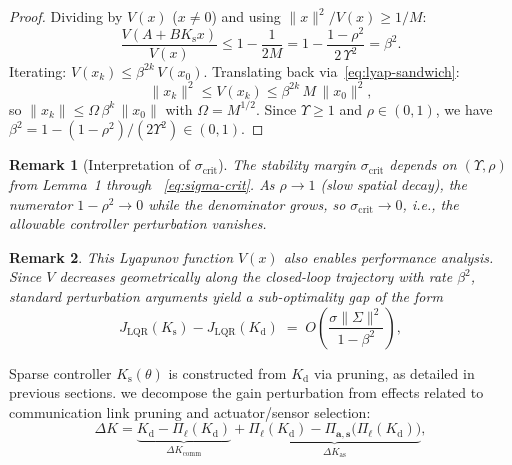 \documentclass[letterpaper, 10pt, conference]{ieeeconf}
\newtheorem{remark}{Remark}
\begin{document}
\begin{proof}
Dividing by $V(x)$ ($x \ne 0$) and using
$\|x\|^{2}/V(x) \ge 1/M$:
\[
  \frac{V(A+BK_{\mathrm{s}} x)}{V(x)}
  \le 1 - \frac{1}{2M} = 1 - \frac{1-\rho^{2}}{2\,\Upsilon^{2}}
  = \beta^{2}.
\]
Iterating: $V(x_k) \le \beta^{2k}\,V(x_0)$.
Translating back via~\eqref{eq:lyap-sandwich}:
\[
  \|x_k\|^{2}
  \le V(x_k)
  \le \beta^{2k}\,M\,\|x_0\|^{2},
\]
so $\|x_k\| \le \Omega\,\beta^{k}\,\|x_0\|$
with $\Omega = M^{1/2}$.
Since $\Upsilon \ge 1$ and $\rho \in (0,1)$,
we have $\beta^{2} = 1 - (1-\rho^2)/(2\Upsilon^2) \in (0,1)$.
\end{proof}

\begin{remark}[Interpretation of $\sigma_{\mathrm{crit}}$]
\label{rem:sigma-crit}
The stability margin $\sigma_{\mathrm{crit}}$ depends
on $(\Upsilon,\rho)$ from Lemma~1
through ~\eqref{eq:sigma-crit}.
As $\rho\to 1$ (slow spatial decay),
the numerator $1-\rho^2\to 0$ while the
denominator grows, so
$\sigma_{\mathrm{crit}}\to 0$, i.e.,
the allowable controller perturbation vanishes.
\end{remark}

\begin{remark}
\label{rem:perf-connection}
This Lyapunov function $V(x)$ also enables performance analysis. Since $V$ decreases geometrically along the closed-loop trajectory with
rate $\beta^{2}$, standard perturbation arguments yield a
sub-optimality gap of the form
\[
  J_{\mathrm{LQR}}(K_{\mathrm{s}})
  - J_{\mathrm{LQR}}(K_{\mathrm{d}})
  \;=\; O\!\left(\frac{\sigma \|\Sigma\|^{2}}{1-\beta^{2}}\right),
\]
\end{remark}

Sparse controller $K_\mathrm{s}(\theta)$
is constructed from $K_{\mathrm{d}}$ via pruning, as detailed in previous sections. we decompose the gain perturbation from effects related to communication link pruning and actuator/sensor selection:
\begin{equation}\label{eq:deltaK-decomp}
  \Delta K
  = \underbrace{K_{\mathrm{d}}
    - \Pi_{\ell}(K_{\mathrm{d}})}
    _{\Delta K_{\mathrm{comm}}}
  + \underbrace{\Pi_\ell(K_{\mathrm{d}})
    - \Pi_{\mathbf{a},\mathbf{s}}\!\bigl(
      \Pi_\ell(K_{\mathrm{d}})\bigr)}
    _{\Delta K_{\mathrm{as}}},
\end{equation}
\end{document}
